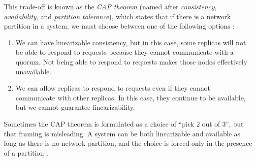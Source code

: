 
\begin{frame}
    \label{s:calendar}
\end{frame}
\label{l:calendar}

This trade-off is known as the \emph{CAP theorem} (named after \emph{consistency}, \emph{availability}, and \emph{partition tolerance}), which states that if there is a network partition in a system, we must choose between one of the following options \citep{Gilbert:2002}:
\begin{enumerate}
    \item We can have linearizable consistency, but in this case, some replicas will not be able to respond to requests because they cannot communicate with a quorum.
        Not being able to respond to requests makes those nodes effectively unavailable.
    \item We can allow replicas to respond to requests even if they cannot communicate with other replicas.
        In this case, they continue to be available, but we cannot guarantee linearizability.
\end{enumerate}
Sometimes the CAP theorem is formulated as a choice of ``pick 2 out of 3'', but that framing is misleading.
A system can be both linearizable and available as long as there is no network partition, and the choice is forced only in the presence of a partition \citep{Kleppmann:2015}.

